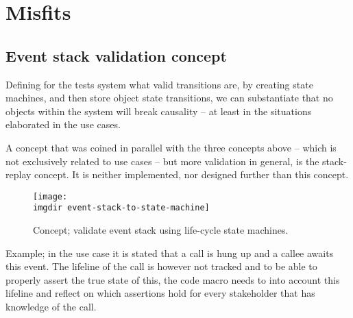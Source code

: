 \chapter{Misfits}

\section{Event stack validation concept}
\label{appendix:event-stack-validation}
Defining for the tests system what valid transitions are, by creating state machines, and then store object state transitions, we can substantiate that no objects within the system will break causality -- at least in the situations elaborated in the use cases.\medskip

\noindent A concept that was coined in parallel with the three concepts above -- which is not exclusively related to use cases -- but more validation in general, is the stack-replay concept. It is neither implemented, nor designed further than this concept.
\begin{figure}[ht]
\centering
\texttt{[image: \\imgdir event-stack-to-state-machine]}
\caption{Concept; validate event stack using life-cycle state machines.}
\label{fig:event-stack-to-state-machine}
\end{figure}
Example; in the use case it is stated that a call is hung up and a callee awaits this event. The lifeline of the call is however not tracked and to be able to properly assert the true state of this, the code macro needs to into account this lifeline and reflect on which assertions hold for every stakeholder that has knowledge of the call. %



